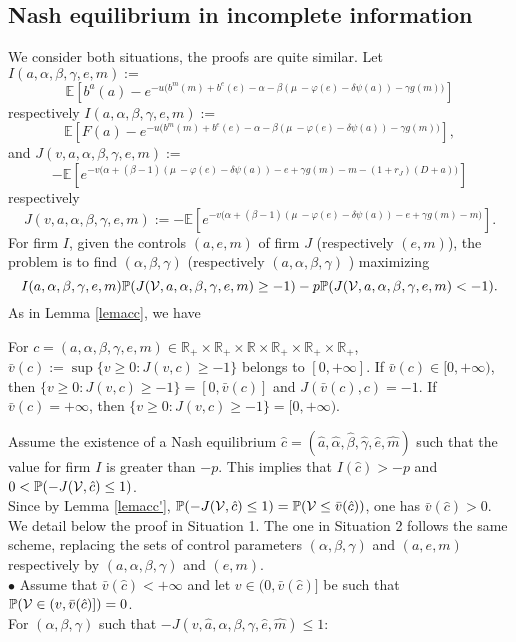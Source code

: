 \documentclass{svjour3}
\begin{document}
\subsection{Nash equilibrium in incomplete information}
We consider both situations, the proofs are quite similar. Let 
$I(a,\alpha,\beta,\gamma,e,m):=$
$${\mathbb{E}} \left[ b^a(a) - e^{-u\big(b^m(m)+b^e(e)-\alpha-\beta(\mu~-\varphi(e)-\delta \psi(a))-\gamma g(m)\big)} \right]$$
respectively $I(a,\alpha,\beta,\gamma,e,m):=$
$${\mathbb{E}} \left[ F(a) - e^{-u\big(b^m(m)+b^e(e)-\alpha-\beta(\mu~-\varphi(e)-\delta \psi(a))-\gamma g(m)\big)}\right] ,$$
and $J(v,a,\alpha,\beta,\gamma,e,m):=$
$$-{\mathbb{E}}\left[ e^{-v\big(\alpha+(\beta-1)(\mu~-\varphi(e)-\delta\psi(a))-e+\gamma{g}(m)-m -(1+r_J)(D+ a)\big)}\right]$$
respectively
$$J(v,a,\alpha,\beta,\gamma,e,m):=-{\mathbb{E}}\left[ e^{-v\big(\alpha+(\beta-1)(\mu~-\varphi(e)-\delta\psi(a))-e+\gamma{g}(m)-m \big)}\right].$$
For firm $I$, given the controls $(a,e,m)$ of firm $J$
(respectively $(e,m)$), the problem is to find $(\alpha,\beta,\gamma)$ 
(respectively $(a,\alpha,\beta,\gamma)$ ) maximizing
$$I(a,\alpha,\beta,\gamma,e,m){\mathbb{P}}(J({\cal V},a,\alpha,\beta,\gamma,e,m)\geq - 1)-p{\mathbb{P}}(J({\cal V},a,\alpha,\beta,\gamma,e,m)<-1).$$
As in Lemma \ref{lemacc}, we have
\begin{lemma}
\label{lemacc'}
For $c=(a,\alpha,\beta,\gamma,e,m)\in\mathbb{R}_+\times\mathbb{R}_+\times\mathbb{R}\times\mathbb{R}_+\times\mathbb{R}_+\times\mathbb{R}_+$, $\bar v(c):=\sup\{v\geq 0:J(v,c)\geq -1\}$ belongs to $[0,+\infty]$. If $\bar v(c)\in[0,+\infty)$, then $\{v\geq 0:J(v,c)\geq -1\}=[0,\bar v(c)]$ and $J(\bar v(c),c)=-1$. If $\bar v(c)=+\infty$, then $\{v\geq 0: J(v,c)\geq -1\}=[0,+\infty)$.
\end{lemma}

Assume the  existence of a Nash equilibrium 
$\hat{c}=(\hat{a},\hat{\alpha},\hat{\beta},\hat{\gamma},\hat{e},\hat{m})$ such that the value for firm $I$ is greater than $-p$. This implies that $I(\hat{c})>-p$ and $0<{\mathbb{P}}(-J({\cal V},\hat{c})\leq 1)$.
\\
Since by Lemma \ref{lemacc'}, ${\mathbb{P}}(-J({\cal V},\hat{c})\leq 1)={\mathbb{P}}({\cal V}\leq \bar v(\hat c))$, one has $\bar v(\hat{c})>0$.\\
We detail below the proof in Situation 1. The one in Situation 2 follows the same scheme, replacing the sets of control parameters $(\alpha,\beta,\gamma)$ and $(a,e,m)$ respectively by $(a,\alpha,\beta,\gamma)$ and $(e,m)$.\\
$\bullet$
Assume that $\bar v(\hat c)<+\infty$ and let $v\in (0,\bar v(\hat c)]$ be such that ${\mathbb{P}}({\cal V}\in (v,\bar v(\hat c)])=0$. 
\\
For $(\alpha,\beta,\gamma)$  such that $-J(v,\hat a,\alpha,\beta,\gamma,\hat e,\hat m)\leq 1$:
\end{document}
